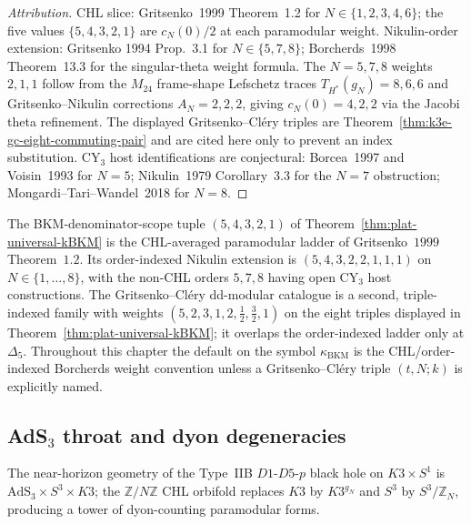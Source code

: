 \begin{proof}[Attribution]
CHL slice: Gritsenko~1999 Theorem~1.2 for
$N \in \{1, 2, 3, 4, 6\}$; the five values
$\{5, 4, 3, 2, 1\}$ are $c_N(0)/2$ at each paramodular weight.
Nikulin-order extension: Gritsenko 1994 Prop.~3.1 for
$N \in \{5, 7, 8\}$; Borcherds~1998 Theorem~13.3 for the singular-theta
weight formula. The $N = 5, 7, 8$ weights $2,1,1$ follow from the
$M_{24}$ frame-shape Lefschetz traces $T_{H^*}(g_N)=8,6,6$ and
Gritsenko--Nikulin corrections $A_N=2,2,2$, giving
$c_N(0)=4,2,2$ via the Jacobi theta refinement. The displayed
Gritsenko--Cl\'ery triples are Theorem~\ref{thm:k3e-gc-eight-commuting-pair}
and are cited here only to prevent an index substitution. CY$_3$ host
identifications are conjectural: Borcea~1997 and Voisin~1993 for
$N=5$; Nikulin~1979 Corollary~3.3 for the $N=7$ obstruction;
Mongardi--Tari--Wandel~2018 for $N=8$.
\end{proof}

\begin{remark}
\label{rem:plat-two-paramodular-families-chl}
The BKM-denominator-scope tuple $(5,4,3,2,1)$ of
Theorem~\ref{thm:plat-universal-kBKM} is the CHL-averaged
paramodular ladder of Gritsenko~$1999$ Theorem~$1.2$. Its
order-indexed Nikulin extension is $(5,4,3,2,2,1,1,1)$ on
$N\in\{1,\ldots,8\}$, with the non-CHL orders $5,7,8$ having
open CY$_3$ host constructions. The Gritsenko--Cl\'ery
dd-modular catalogue is a second, triple-indexed family with weights
$(5,2,3,1,2,\tfrac12,\tfrac32,1)$ on the eight triples displayed in
Theorem~\ref{thm:plat-universal-kBKM}; it overlaps the order-indexed
ladder only at $\Delta_5$. Throughout this chapter the default on the
symbol $\kappa_{\mathrm{BKM}}$ is the CHL/order-indexed Borcherds
weight convention unless a Gritsenko--Cl\'ery triple $(t,N;k)$ is
explicitly named.
\end{remark}

\subsection{AdS\texorpdfstring{$_3$}{-3} throat and dyon degeneracies}
\label{subsec:k3e-platonic-ads3}

The near-horizon geometry of the Type~IIB $D1$-$D5$-$p$ black hole on $K3 \times S^1$ is $\mathrm{AdS}_3 \times S^3 \times K3$; the $\mathbb{Z}/N\mathbb{Z}$ CHL orbifold replaces $K3$ by $K3^{g_N}$ and $S^3$ by $S^3/\mathbb{Z}_N$, producing a tower of dyon-counting paramodular forms.

